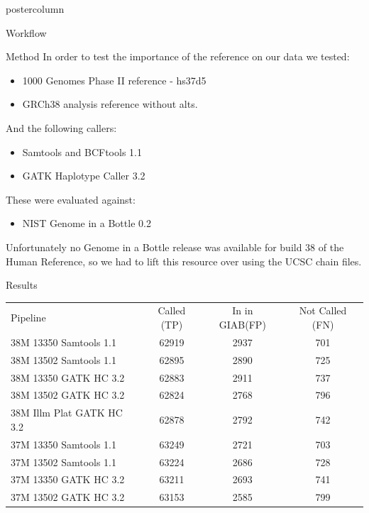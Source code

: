 \documentclass[final]{beamer}
\begin{document}
\begin{frame}{}
\begin{columns}
\begin{column}{.49\textwidth}
\begin{beamercolorbox}[center,wd=\textwidth]{postercolumn}
\begin{minipage}[T]{.95\textwidth}
\begin{block}{Workflow}
            \end{block}
            \begin{block}{Method}
              In order to test the importance of the reference on our data we tested: 
                \begin{itemize} 
                    \item 1000 Genomes Phase II reference - hs37d5
                    \item GRCh38 analysis reference without alts.
                \end{itemize}
              And the following callers:
                \begin{itemize} 
                    \item Samtools and BCFtools 1.1
                    \item GATK Haplotype Caller 3.2
                \end{itemize}
              These were evaluated against:
                \begin{itemize} 
                    \item NIST Genome in a Bottle 0.2
                \end{itemize}
                Unfortunately no Genome in a Bottle release was available for build 38 of the Human Reference, so we had to lift this resource over using the UCSC chain files.
            \end{block}
            \begin{block}{Results}
\begin{tabular}{|l|c|c|c|}
\hline
Pipeline & Called (TP) & In in GIAB(FP) & Not Called (FN) \\ \cline{1-4}
38M 13350 Samtools 1.1 & 62919 & 2937 & 701 \\ \cline{1-4}
38M 13502 Samtools 1.1 & 62895 & 2890 & 725 \\ \cline{1-4}
38M 13350 GATK HC 3.2 & 62883 & 2911 & 737 \\ \cline{1-4}
38M 13502 GATK HC 3.2 & 62824 & 2768 & 796 \\ \cline{1-4}
38M Illm Plat GATK HC 3.2 & 62878 & 2792 & 742 \\ \cline{1-4}
37M 13350 Samtools 1.1 & 63249 & 2721 & 703 \\ \cline{1-4}
37M 13502 Samtools 1.1 & 63224 & 2686 & 728 \\ \cline{1-4}
37M 13350 GATK HC 3.2 & 63211 & 2693 & 741 \\ \cline{1-4}
37M 13502 GATK HC 3.2 & 63153 & 2585 & 799 \\ \cline{1-4}
\hline
\end{tabular}
            \end{block}
            \vfill


\end{minipage}
\end{beamercolorbox}
\end{column}
\end{columns}
\end{frame}
\end{document}
